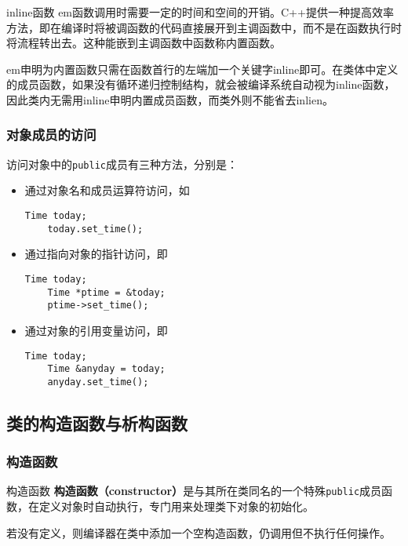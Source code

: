 \documentclass[10pt, a4paper, oneside, fontset=none]{ctexart}
\theoremstyle{plain}
\theoremstyle{definition}
\newenvironment{twoc}{\vspace{-11pt}\begin{multicols}{2}}{\end{multicols}\vspace{-9pt}}
\newcommand{\colors}[1]{\color{#1!75!black}}
\newcommand{\hang}[1][1]{\hangafter 1 \hangindent #1em}
\newcommand{\de}[2][]{\begin{defil}{#1}\kai #2\end{defil}}
\newcommand{\zhu}[2][]{\begin{note}{#1}\xiu #2\end{note}}
\newcommand{\tboba}[1]{\textbf{\kai\color{bali!75!black}#1}}
\begin{document}
\begin{twoc}
\zhu[inline函数]{
	\hang 函数调用时需要一定的时间和空间的开销。C++提供一种提高效率方法，即在编译时将被调函数的代码直接展开到主调函数中，而不是在函数执行时将流程转出去。这种能嵌到主调函数中函数称内置函数。

	\hang 申明为内置函数只需在函数首行的左端加一个关键字inline即可。在类体中定义的成员函数，如果没有循环递归控制结构，就会被编译系统自动视为inline函数，因此类内无需用inline申明内置成员函数，而类外则不能省去inlien。
}

\subsubsection{对象成员的访问}
访问对象中的\texttt{public}成员有三种方法，分别是：
\begin{itemize}
	\item 通过对象名和成员运算符访问，如
	\begin{lstlisting}[xleftmargin=1em,
		moreemph={Time}, emphstyle=\colors{qinglv}, 
		moreemph={[2]{today}}, emphstyle={[2]\it\ttfamily},]
	Time today;
	today.set_time();
	\end{lstlisting}
	\item 通过指向对象的指针访问，即
	\begin{lstlisting}[xleftmargin=1em, 
		moreemph={Time}, emphstyle=\colors{qinglv}, 
		moreemph={[2]{today, ptime}}, emphstyle={[2]\it\ttfamily},]
	Time today;
	Time *ptime = &today;
	ptime->set_time();
	\end{lstlisting}
	\item 通过对象的引用变量访问，即
	\begin{lstlisting}[xleftmargin=1em, 
		moreemph={Time}, emphstyle=\colors{qinglv}, 
		moreemph={[2]{today, anyday}}, emphstyle={[2]\it\ttfamily},]
	Time today;
	Time &anyday = today;
	anyday.set_time();
	\end{lstlisting}
\end{itemize}

\end{twoc}

\subsection{类的构造函数与析构函数}


\subsubsection{构造函数}
\de[构造函数]{
	\tboba{构造函数（constructor）}是与其所在类同名的一个特殊\texttt{public}成员函数，在定义对象时自动执行，专门用来处理类下对象的初始化。
}
若没有定义，则编译器在类中添加一个空构造函数，仍调用但不执行任何操作。
\end{document}
